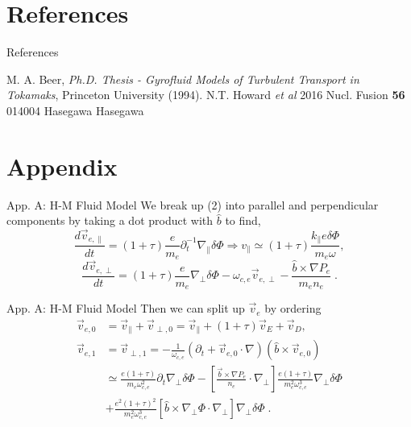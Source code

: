 \documentclass[aspectratio=43]{beamer}
\begin{document}
   \section*{References}
      \begin{frame}{References}
          \begin{thebibliography}{0}
              M. A. Beer, \textit{Ph.D. Thesis - Gyrofluid Models of Turbulent Transport in Tokamaks}, Princeton University (1994).
              N.T. Howard \textit{et al} 2016 Nucl. Fusion \textbf{56} 014004
              Hasegawa
              Hasegawa
          \end{thebibliography}
      \end{frame}

   \section*{Appendix}

   \begin{frame}{App. A: H-M Fluid Model}
      \quad We break up (2) into parallel and perpendicular components by taking a dot product with $\hat{b}$ to find,
      \begin{equation}
         \frac{d\vec{v}_{e,\parallel}}{dt} = (1+\tau)\frac{e}{m_e}\partial_t^{-1}\nabla_{\parallel}\delta\Phi \Rightarrow v_{\parallel}
            \simeq (1+\tau)\frac{k_{\parallel}e\delta\Phi}{m_e\omega},
      \end{equation}
      \begin{equation}
         \frac{d\vec{v}_{e,\perp}}{dt} = (1+\tau)\frac{e}{m_e}\nabla_{\perp}\delta\Phi - \omega_{c,e}\vec{v}_{e,\perp}-\frac{\hat{b}\times\nabla P_e}{m_en_e}\;.
      \end{equation}
   \end{frame}

   \begin{frame}{App. A: H-M Fluid Model}
      \quad Then we can split up $\vec{v}_e$ by ordering
      \begin{equation}
      \begin{aligned}
         \vec{v}_{e,0} &= \vec{v}_{\parallel} + \vec{v}_{\perp,0} = \vec{v}_{\parallel} + \left(1 + \tau\right)\vec{v}_E + \vec{v}_D,  \\
         \vec{v}_{e,1} &= \vec{v}_{\perp,1} = -\frac{1}{\omega_{c,e}}(\partial_t+\vec{v}_{e,0}\cdot\nabla)(\hat{b}\times\vec{v}_{e,0}) \\
                       &\simeq \frac{e(1+\tau)}{m_e\omega_{c,e}^2}\partial_t\nabla_{\perp}\delta\Phi - [\frac{\vec{b}\times\nabla P_e}{n_e}\cdot\nabla_{\perp}]
                               \frac{e(1+\tau)}{m_e^2\omega_{c,e}^3}\nabla_{\perp}\delta\Phi \\
                       &+      \frac{e^2(1+\tau)^2}{m_e^2\omega_{c,e}^3}[\hat{b}\times\nabla_{\perp}\Phi\cdot\nabla_{\perp}]\nabla_{\perp}\delta\Phi\;.
      \end{aligned}
      \end{equation}
   \end{frame}
\end{document}
